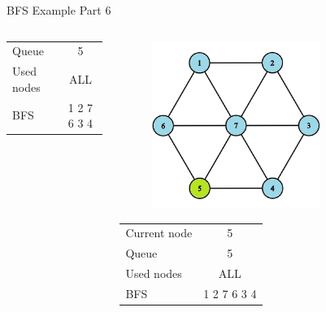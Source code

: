 \documentclass[aspectratio=169]{beamer}%
\begin{document}
\begin{frame}{BFS Example Part 6}
\begin{columns}
\begin{column}{0.32\textwidth}
\begin{table}[ht]
\begin{tabular}{l c}
                    Queue & 5\\ 
                    Used nodes & ALL\\
                    BFS & 1 2 7 6 3  4
                \end{tabular}
            \end{table}
        \end{column}
        \hfill
        \begin{column}{0.32\textwidth}
            \begin{figure}[!ht]
                \centering
                \includegraphics[width=0.9\linewidth]{bfs 17.png}
            \end{figure}
            \begin{table}[ht]
                \centering
                \begin{tabular}{l c}
                    Current node & 5\\
                    Queue & 5\\ 
                    Used nodes & ALL\\
                    BFS & 1 2 7 6 3 4
                \end{tabular}
            \end{table}
        \end{column}
        \hfill
        \begin{column}{0.32\textwidth}
            \begin{figure}[!ht]

\end{figure}
\end{column}
\end{columns}
\end{frame}
\end{document}
